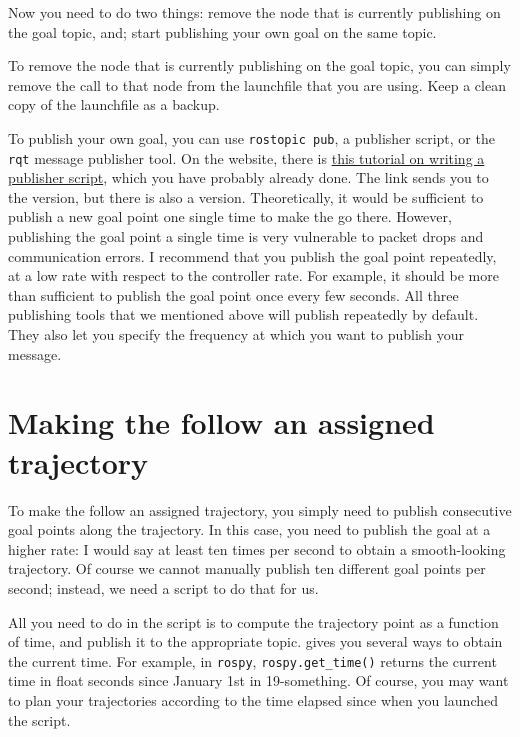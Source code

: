 Now you need to do two things: remove the node that is currently publishing on the goal topic, and; start publishing your own goal on the same topic.

To remove the node that is currently publishing on the goal topic, you can simply remove the call to that node from the launchfile that you are using.
Keep a clean copy of the launchfile as a backup.

To publish your own goal, you can use \lstinline|rostopic pub|, a publisher script, or the \lstinline|rqt| message publisher tool.
On the \ROS{} website, there is \href{http://wiki.ros.org/ROS/Tutorials/WritingPublisherSubscriber%28python%29}{this tutorial on writing a publisher script}, which you have probably already done.
The link sends you to the \Python{} version, but there is also a \Cpp{} version.
Theoretically, it would be sufficient to publish a new goal point one single time to make the \CF{} go there.
However, publishing the goal point a single time is very vulnerable to packet drops and communication errors.
I recommend that you publish the goal point repeatedly, at a low rate with respect to the controller rate.
For example, it should be more than sufficient to publish the goal point once every few seconds.
All three publishing tools that we mentioned above will publish repeatedly by default. They also let you specify the frequency at which you want to publish your message.



\section*{Making the \CF{} follow an assigned trajectory}

To make the \CF{} follow an assigned trajectory, you simply need to publish consecutive goal points along the trajectory.
In this case, you need to publish the goal at a higher rate: I would say at least ten times per second to obtain a smooth-looking trajectory.
Of course we cannot manually publish ten different goal points per second; instead, we need a script to do that for us.

All you need to do in the script is to compute the trajectory point as a function of time, and publish it to the appropriate topic.
\ROS{} gives you several ways to obtain the current time.
For example, in \lstinline|rospy|, \lstinline|rospy.get_time()| returns the current time in float seconds since January 1st in 19-something.
Of course, you may want to plan your trajectories according to the time elapsed since when you launched the script.

